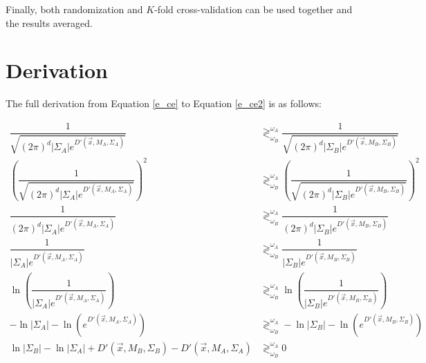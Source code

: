 \documentclass{article}
\begin{document}
Finally, both randomization and $K$-fold cross-validation can be used
together and the results averaged.

\appendix
\section{Derivation}
\label{app:derivation}

The full derivation from Equation \ref{e_ce} to Equation \ref{e_ce2} is
as follows:

\begin{align*}
  \dfrac{1}{\sqrt{(2\pi)^d |\Sigma_A| e^{D'(\vec{x},M_A,\Sigma_A)}}} 
  &\gtrless^{\omega_A}_{\omega_B}
  \dfrac{1}{\sqrt{(2\pi)^d |\Sigma_B| e^{D'(\vec{x},M_B,\Sigma_B)}}} \\
  \left(\dfrac{1}{\sqrt{(2\pi)^d |\Sigma_A| e^{D'(\vec{x},M_A,\Sigma_A)}}}\right)^2
  &\gtrless^{\omega_A}_{\omega_B}
  \left(\dfrac{1}{\sqrt{(2\pi)^d |\Sigma_B| e^{D'(\vec{x},M_B,\Sigma_B)}}}\right)^2 \\
  \dfrac{1}{(2\pi)^d |\Sigma_A| e^{D'(\vec{x},M_A,\Sigma_A)}}
  &\gtrless^{\omega_A}_{\omega_B}
  \dfrac{1}{(2\pi)^d |\Sigma_B| e^{D'(\vec{x},M_B,\Sigma_B)}} \\
  \dfrac{1}{|\Sigma_A| e^{D'(\vec{x},M_A,\Sigma_A)}}
  &\gtrless^{\omega_A}_{\omega_B}
  \dfrac{1}{|\Sigma_B| e^{D'(\vec{x},M_B,\Sigma_B)}} \\
  \ln\left(\dfrac{1}{|\Sigma_A| e^{D'(\vec{x},M_A,\Sigma_A)}}\right)
  &\gtrless^{\omega_A}_{\omega_B}
  \ln\left(\dfrac{1}{|\Sigma_B| e^{D'(\vec{x},M_B,\Sigma_B)}}\right) \\
  -\ln|\Sigma_A| - \ln(e^{D'(\vec{x},M_A,\Sigma_A)})
  &\gtrless^{\omega_A}_{\omega_B}
  -\ln|\Sigma_B| - \ln(e^{D'(\vec{x},M_B,\Sigma_B)}) \\
  \ln|\Sigma_B| - \ln|\Sigma_A| +
  D'(\vec{x},M_B,\Sigma_B) - D'(\vec{x},M_A,\Sigma_A)
  &\gtrless^{\omega_A}_{\omega_B}
  0
\end{align*}


\end{document}
